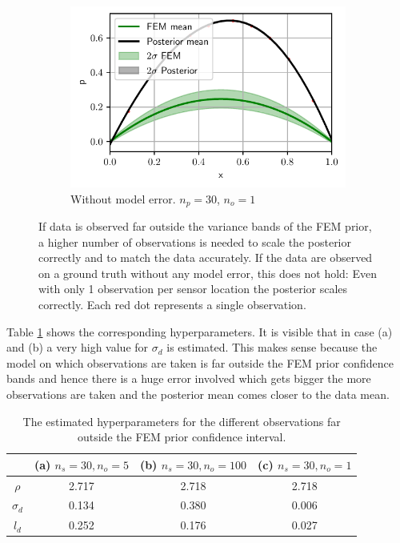 \documentclass[%
  a4paper,oneside,%
  11pt,%
  smallchapters,
  style=printdev,
  extramargin,
  green,%
  rgb, <cmyk>
  ]{tubsbook}
\begin{document}
\begin{figure}[!ht]
	\begin{subfigure}[t]{.5\textwidth}
	\centering
	\includegraphics[width=1\linewidth]{../../Python/Results/1D/PriorDataConflict/No_Model_Error/Result.pdf}
	\caption{Without model error. $n_p=30$, $n_o=1$}
		\label{fig:1DConflictc}
	\end{subfigure}
	

\caption[Posterior of the 1D example for observations far outside the FEM prior variance band]{If data is observed far outside the variance bands of the FEM prior, a higher number of observations is needed to scale the posterior correctly and to match the data accurately. If the data are observed on a ground truth without any model error, this does not hold: Even with only 1 observation per sensor location the posterior scales correctly. Each red dot represents a single observation.}
\label{fig:1DConflict}
\end{figure}
%

Table \ref{tab:HyperParConflict1D} shows the corresponding hyperparameters. It is visible that in case (a) and (b) a very high value for $\sigma_d$ is estimated. This makes sense because the model on which observations are taken is far outside the FEM prior confidence bands and hence there is a huge error involved which gets bigger the more observations are taken and the posterior mean comes closer to the data mean.
	

	
\begin{table}[!ht]
\centering
\caption{The estimated hyperparameters for the different observations far outside the FEM prior confidence interval. }
\label{tab:HyperParConflict1D}
\begin{tabular}{cccc}
\hline
           & (a) $n_s = 30, n_o = 5$ & (b) $n_s = 30, n_o = 100$ & (c) $n_s = 30, n_o = 1$ \\ \hline
$\rho$     & 2.717                   & 2.718                     & 2.718                   \\
$\sigma_d$ & 0.134                   & 0.380                     & 0.006                   \\
$l_d$      & 0.252                   & 0.176                     & 0.027                   \\ \hline
\end{tabular}
\end{table}
	
\end{document}
